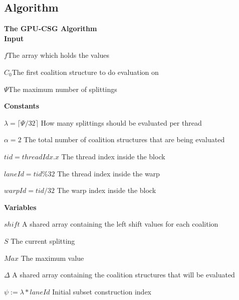 \documentclass[a4paper, 12pt]{report}
\begin{document}
\subsection{Algorithm}

\textbf{The GPU-CSG Algorithm\label{gpudp}} \\

\textbf{Input}

$f$\hfill The array which holds the values

$C_0$\hfill The first coalition structure to do evaluation on

$\Psi$\hfill The maximum number of splittings

\textbf{Constants}

$\lambda = \lceil\Psi/32\rceil$ \hfill How many splittings should be evaluated per thread

$\alpha = 2$ \hfill The total number of coalition structures that are being evaluated

$tid = threadIdx.x$ \hfill The thread index inside the block

$laneId = tid \% 32$ \hfill The thread index inside the warp

$warpId = tid / 32$ \hfill The warp index inside the block

\textbf{Variables} 

$shift$ \hfill A shared array containing the left shift values for each coalition

$S$ \hfill The current splitting

$Max$ \hfill The maximum value

$\Delta$ \hfill A shared array containing the coalition structures that will be evaluated 


$\psi := \lambda*laneId$ \hfill Initial subset construction index
\end{document}
